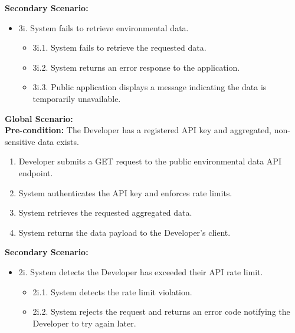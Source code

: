 {\begin{enumerate}[{\bf BE1.}]
\begin{enumerate}[{\bf VP1.}]
        {\bf Secondary Scenario:}
        \begin{itemize}
            \item[] {3i.} System fails to retrieve environmental data.
            \begin{itemize}
                \item[] {3i.1.} System fails to retrieve the requested data.
                \item[] {3i.2.} System returns an error response to the application.
                \item[] {3i.3.} Public application displays a message indicating the data is temporarily unavailable.
            \end{itemize}
        \end{itemize}
    \end{enumerate}
    {\bf Global Scenario:} \\
    {\bf Pre-condition:} The Developer has a registered API key and aggregated, non-sensitive data exists.
        \begin{enumerate}[1. ]
            \item Developer submits a GET request to the public environmental data API endpoint.
            \item System authenticates the API key and enforces rate limits.
            \item System retrieves the requested aggregated data.
            \item System returns the data payload to the Developer's client.
        \end{enumerate}

    {\bf Secondary Scenario:}
        \begin{itemize}
            \item[] {2i.} System detects the Developer has exceeded their API rate limit.
            \begin{itemize}
                \item[] {2i.1.} System detects the rate limit violation.
                \item[] {2i.2.} System rejects the request and returns an error code notifying the Developer to try again later.
            \end{itemize}
        \end{itemize}


\end{enumerate}}
